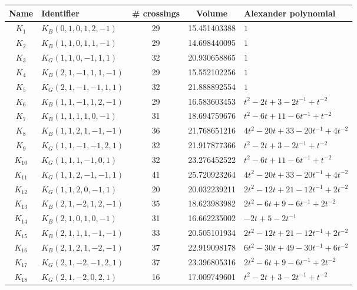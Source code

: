 \documentclass [11pt]{amsart}
\theoremstyle{remark}
\begin{document}
\renewcommand{\arraystretch}{1.2}
\begin{table}
  \begin{center}
    \begin{tabular}{|c| l |  c | c | l |} 
    \hline
     Name & Identifier & \# crossings & Volume & Alexander polynomial \\
     \hline
    $K_1$ & $ K_B(0, 1, 0, 1, 2, -1)$ & $29$ & 15.451403388 & $1$ \\
    $K_2$ & $K_B(1,1,0,1,1,-1)$ & 29 & 14.698440095 & $1$ \\
    $K_3$ &  $K_G(1, 1, 0,-1, 1, 1)$ & 32 & 20.930658865 & $1$\\
    $K_{4}$ &  $K_B(2, 1, -1, 1, 1, -1)$  & 29 & 15.552102256 & $1$ \\
   $K_{5}$ & $K_G(2, 1, -1, -1, 1, 1)$ & 32 & 21.888892554 & $1$ \\     
   $ K_6$ &  $K_B(1, 1, -1, 1, 2, -1)$ & 29 & 16.583603453 & $t^2 -2t+ 3 -2t^{-1} + t^{-2}$  \\
   $K_7$ & $K_B(1, 1, 1, 1, 0, -1)$ & 31 & 18.694759676 & $t^2 -6t + 11 -6t^{-1} + t^{-2}$ \\
   $K_8$ & $ K_B(1, 1, 2, 1, -1, -1)$ & 36 & 21.768651216 & $ 4t^2 - 20t +33 - 20t^{-1} + 4 t^{-2}$\\
   $K_9$ & $K_G(1, 1, -1, -1, 2, 1)$ & 32 & 21.917877366 & $t^2 - 2t+ 3-2t^{-1} + t^{-2}$ \\
   $K_{10}$ & $K_G(1,1,1,-1,0,1)$ & 32 &  23.276452522 & $t^2 -6t + 11 -6t^{-1} + t^{-2}$\\
   $K_{11}$ & $K_G(1, 1, 2, -1, -1, 1)$ & 41 & 25.720923264 & $4t^2 -20t + 33 -20t^{-1} + 4t^{-2}$\\
   $K_{12}$ & $K_G(1, 1, 2, 0, -1, 1)$ & 20 & 20.032239211 & $2t^2-12t+21-12t^{-1}+2t^{-2}$\\
   $K_{13}$ & $K_B(2, 1,-2, 1, 2, -1)$ & 35 &  18.623983982 & $2t^2-6t+9-6t^{-1}+2t^{-2}$\\
   $K_{14}$ & $K_B(2, 1, 0, 1, 0, -1)$ & 31 & 16.662235002 & $-2t+5 - 2t^{-1}$ \\
   $K_{15}$ & $K_B(2, 1, 1, 1, -1, -1)$ & 33 & 20.505101934 & $2t^2-12t+21-12t^{-1}+2t^{-2}$ \\
   $K_{16}$ &  $K_B(2, 1, 2, 1, -2, -1)$ & 37 & 22.919098178 & $6t^2 - 30t + 49 -30t^{-1} + 6t^{-2}$ \\
   $K_{17}$ & $K_G(2,1,-2,-1,2,1)$ &37 &23.396805316 &  $2t^2-6t+9-6t^{-1}+2t^{-2}$ \\
   $K_{18}$ & $K_G(2,1,-2,0,2,1)$ & 16 & 17.009749601 & $t^2 -2t+ 3 -2t^{-1} + t^{-2}$ \\

\end{tabular}
\end{center}
\end{table}
\end{document}
